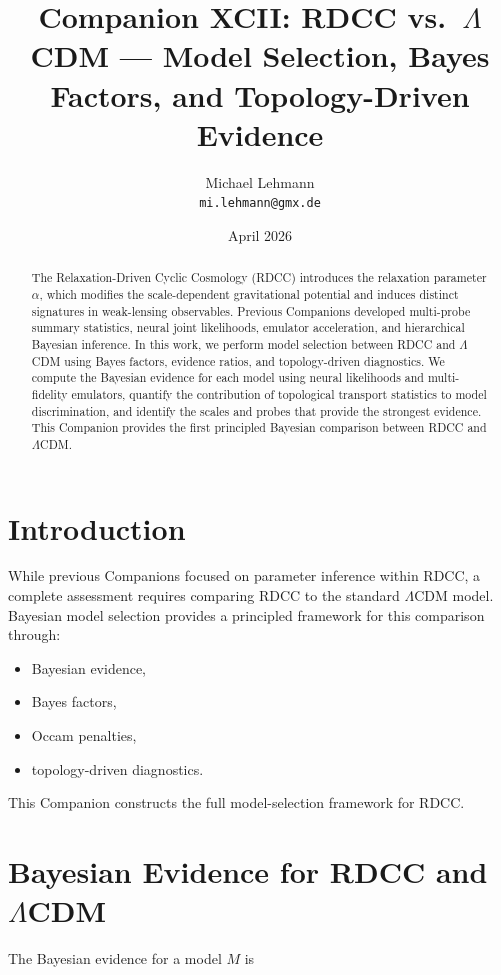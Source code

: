 \documentclass[11pt,a4paper]{article}
\title{\textbf{Companion XCII: RDCC vs.\ $\Lambda$CDM --- Model Selection, Bayes Factors, and Topology-Driven Evidence}}
\author{Michael Lehmann \\ \texttt{mi.lehmann@gmx.de}}
\date{April 2026}
\begin{document}
\maketitle

\begin{abstract}
The Relaxation-Driven Cyclic Cosmology (RDCC) introduces the relaxation parameter 
$\alpha$, which modifies the scale-dependent gravitational potential and induces 
distinct signatures in weak-lensing observables. Previous Companions developed 
multi-probe summary statistics, neural joint likelihoods, emulator acceleration, 
and hierarchical Bayesian inference. In this work, we perform model selection 
between RDCC and $\Lambda$CDM using Bayes factors, evidence ratios, and 
topology-driven diagnostics. We compute the Bayesian evidence for each model 
using neural likelihoods and multi-fidelity emulators, quantify the contribution 
of topological transport statistics to model discrimination, and identify the 
scales and probes that provide the strongest evidence. This Companion provides 
the first principled Bayesian comparison between RDCC and $\Lambda$CDM.
\end{abstract}
\section{Introduction}

While previous Companions focused on parameter inference within RDCC, a complete 
assessment requires comparing RDCC to the standard $\Lambda$CDM model. Bayesian 
model selection provides a principled framework for this comparison through:

\begin{itemize}
    \item Bayesian evidence,
    \item Bayes factors,
    \item Occam penalties,
    \item topology-driven diagnostics.
\end{itemize}

This Companion constructs the full model-selection framework for RDCC.
\section{Bayesian Evidence for RDCC and \texorpdfstring{$\Lambda$CDM}{ΛCDM}}

The Bayesian evidence for a model $M$ is
\end{document}
